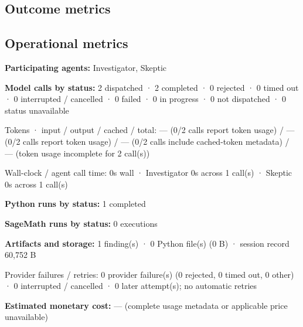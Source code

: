 \documentclass[11pt]{article}
\begin{document}
\subsection{Outcome metrics}
\subsection{Operational metrics}
\textbf{Participating agents:} Investigator, Skeptic\par
\textbf{Model calls by status:} 2 dispatched · 2 completed · 0 rejected · 0 timed out · 0 interrupted / cancelled · 0 failed · 0 in progress · 0 not dispatched · 0 status unavailable\par
Tokens · input / output / cached / total: — (0/2 calls report token usage) / — (0/2 calls report token usage) / — (0/2 calls include cached-token metadata) / — (token usage incomplete for 2 call(s))\par
Wall-clock / agent call time: 0s wall · Investigator 0s across 1 call(s) · Skeptic 0s across 1 call(s)\par
\textbf{Python runs by status:} 1 completed\par
\textbf{SageMath runs by status:} 0 executions\par
\textbf{Artifacts and storage:} 1 finding(s) · 0 Python file(s) (0 B) · session record 60,752 B\par
Provider failures / retries: 0 provider failure(s) (0 rejected, 0 timed out, 0 other) · 0 interrupted / cancelled · 0 later attempt(s); no automatic retries\par
\textbf{Estimated monetary cost:} — (complete usage metadata or applicable price unavailable)\par
\end{document}
